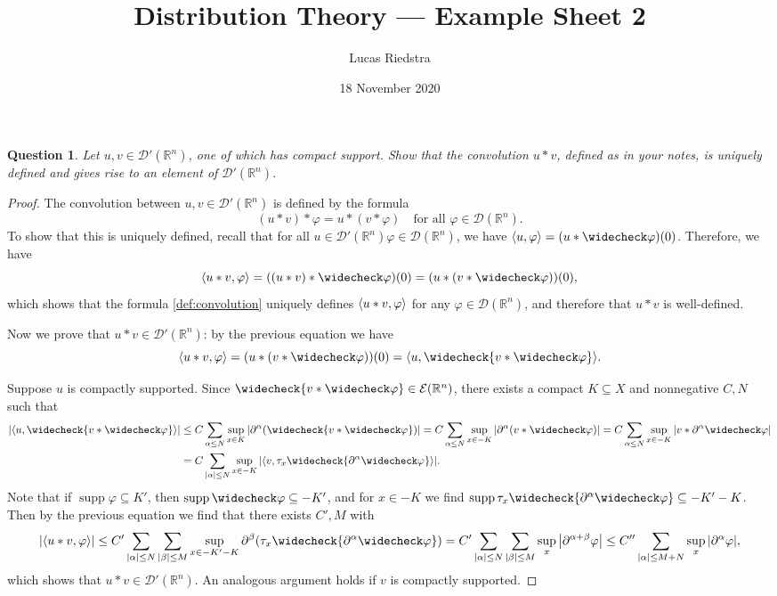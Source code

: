 \documentclass{article}
\title{Distribution Theory --- Example Sheet 2} %
\author{Lucas Riedstra}
\date{18 November 2020} %
\theoremstyle{plain}
\newtheorem{question}{Question}
\theoremstyle{remark}
\renewcommand{\phi}{\varphi}
\newcommand{\Bb}{\mathbb}
\newcommand{\Cal}{\mathcal}
\newcommand{\RR}{\Bb R}
\newcommand{\DD}{\Cal D}
\newcommand\EE{\Cal E}
\DeclarePairedDelimiter{\ang}{\langle}{\rangle}
\newcommand\pt\partial
\newcommand\refl\widecheck
\DeclareMathOperator{\supp}{supp}
\begin{document}
\maketitle
\begin{question}
Let $u, v \in \DD'(\RR^n)$, one of which has compact support. Show that the convolution $u * v$, defined as in your notes, is uniquely defined and gives rise to an element of $\DD'(\RR^n)$. 
\end{question}

\begin{proof}
	The convolution between $u, v \in \DD'(\RR^n)$ is defined by the formula
	\begin{equation} \label{def:convolution}
	(u * v) * \phi = u * (v * \phi) \quad\text{for all $\phi \in \DD(\RR^n)$}. 
	\end{equation}
	To show that this is uniquely defined, recall that for all $u \in \DD'(\RR^n) \phi\in \DD(\RR^n)$, we have $\ang{u, \phi} = (u * \refl\phi)(0)$. Therefore, we have
	\[
	\ang{u * v, \phi} = ((u * v) * \refl\phi)(0) = (u * (v * \refl\phi))(0),
	\]
	which shows that the formula \cref{def:convolution} uniquely defines $\ang{u * v, \phi}$ for any $\phi \in \DD(\RR^n)$, and therefore that $u * v$ is well-defined. 
	
	Now we prove that $u * v \in \DD'(\RR^n)$: by the previous equation we have
	\[
	\ang{u * v, \phi} = (u * (v * \refl\phi))(0) = \ang{u, \refl{v * \refl\phi}}.
	\]
	
	Suppose $u$ is compactly supported. Since $\refl{v * \refl\phi} \in \EE(\RR^n)$, there exists a compact $K \subseteq X$ and nonnegative $C, N$ such that
	\begin{align*}
		\abs{\ang{u, \refl{v * \refl\phi}}} &\leq C \sum_{\alpha \leq N} \sup_{x \in K} \abs{\pt^\alpha (\refl{v * \refl\phi})} = C \sum_{\alpha \leq N} \sup_{x \in -K} \abs{\pt^\alpha (v * \refl\phi)} = C \sum_{\alpha \leq N} \sup_{x \in -K} \abs{v * \pt^\alpha\refl\phi}\\
		&= C \sum_{\abs{\alpha} \leq N} \sup_{x \in -K} \abs{\ang{v, \tau_x \refl{\pt^\alpha \refl\phi}}}.
	\end{align*}
	Note that if $\supp\phi \subseteq K'$, then $\supp\refl\phi \subseteq -K'$, and for $x \in -K$ we find $\supp \tau_x \refl{\pt^\alpha \refl\phi} \subseteq -K' -K$. Then by the previous equation we find that there exists $C', M$ with
	\[
	\abs{\ang{u * v, \phi}} \leq C' \sum_{\abs{\alpha} \leq N} \sum_{\abs{\beta} \leq M} \sup_{x \in -K' - K} \pt^\beta (\tau_x \refl{\pt^\alpha \refl\phi}) = C' \sum_{\abs{\alpha} \leq N} \sum_{\abs{\beta} \leq M} \sup_x \abs{\pt^{\alpha + \beta} \phi} \leq C'' \sum_{\abs{\alpha} \leq M + N} \sup_x \abs{\pt^\alpha \phi},
	\]
	which shows that $u* v \in \DD'(\RR^n)$. An analogous argument holds if $v$ is compactly supported. 
\end{proof}
\end{document}

